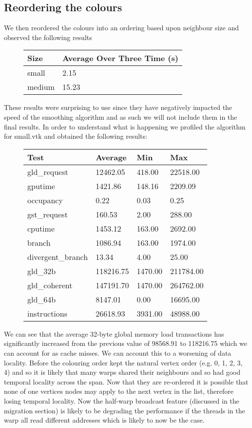 \subsection{Reordering the colours}
We then reordered the colours into an ordering based upon neighbour size and observed the following results\\
\begin{figure}[H]\centering \begin{tabular}{ l | l }
  \hline
  Size & Average Over Three Time (s) \\
  \hline
  \hline
  small & 2.15 \\
  medium & 15.23 \\
  \hline
\end{tabular} \end{figure}

These results were surprising to use since they have negatively impacted the speed of the smoothing algorithm and as such we will not include them in the final results. In order to understand what is happening we profiled the algorithm for small.vtk and obtained the following results:\\

\begin{figure}[H]\centering \begin{tabular}{ l | l | l | l}
\hline
Test & Average & Min & Max \\
\hline
\hline
gld\_request & 12462.05 & 418.00 & 22518.00 \\
gputime & 1421.86 & 148.16 & 2209.09 \\
occupancy & 0.22 & 0.03 & 0.25 \\
gst\_request & 160.53 & 2.00 & 288.00 \\
cputime & 1453.12 & 163.00 & 2692.00 \\
branch & 1086.94 & 163.00 & 1974.00 \\
divergent\_branch & 13.34 & 4.00 & 25.00 \\
gld\_32b & 118216.75 & 1470.00 & 211784.00 \\
gld\_coherent & 147191.70 & 1470.00 & 264762.00 \\
gld\_64b & 8147.01 & 0.00 & 16695.00 \\
instructions & 26618.93 & 3931.00 & 48988.00 \\
\hline
\end{tabular} \end{figure}

We can see that the average 32-byte global memory load transactions has significantly increased from the previous value of 98568.91 to 118216.75 which we can account for as cache misses. We can account this to a worsening of data locality. Before the colouring order kept the natural vertex order (e.g. 0, 1, 2, 3, 4) and so it is likely that many warps shared their neighbours and so had good temporal locality across the span.
Now that they are re-ordered it is possible that none of one vertices nodes may apply to the next vertex in the list, therefore losing temporal locality.
Now the half-warp broadcast feature (discussed in the migration section) is likely to be degrading the performance if the
threads in the warp all read different addresses which is likely to now be the case.

